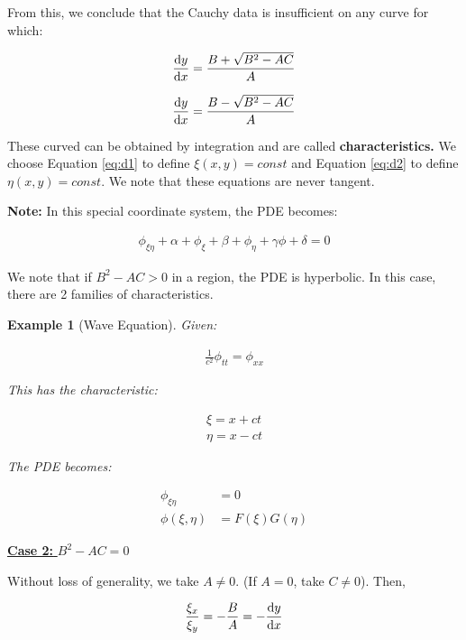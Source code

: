 \documentclass{article}
\newtheorem{ex}{Example}
\theoremstyle{definition}
\begin{document}
	From this, we conclude that the Cauchy data is insufficient on any curve for which:
	
	\begin{align}\label{eq:d1}
	\dv{y}{x} = \frac{B + \sqrt{B^2-AC}}{A}
	\end{align}
	
	\begin{align}\label{eq:d2}
	\dv{y}{x} = \frac{B - \sqrt{B^2-AC}}{A}
	\end{align}
	
	These curved can be obtained by integration and are called \textbf{characteristics.} We choose Equation \ref{eq:d1} to define $\xi(x,y) = const$ and Equation \ref{eq:d2} to define $\eta(x,y) = const$. We note that these equations are never tangent.
	
	\textbf{Note: } In this special coordinate system, the PDE becomes:
	
	\begin{align*}
	\phi_{\xi \eta} +\alpha + \phi_\xi + \beta + \phi_\eta + \gamma \phi + \delta = 0
	\end{align*}
	
	We note that if $B^2-AC>0$ in a region, the PDE is hyperbolic. In this case, there are 2 families of characteristics. 
	
	\begin{ex}[Wave Equation]
		Given:
		
		\begin{align*}
		\frac{1}{c^2}\phi_{tt}= \phi_{xx}
		\end{align*}
		
		This has the characteristic:
		
		\begin{align*}
		\xi = x + ct \\ 
		\eta = x - ct
		\end{align*}
		
		The PDE becomes:
		
		\begin{align*}
		\phi_{\xi \eta} &= 0 \\ 
		\phi(\xi, \eta)& = F(\xi) G(\eta)
		\end{align*}
	\end{ex}

\underline{\textbf{Case 2:} $B^2 - AC = 0$}

Without loss of generality, we take $A\neq 0$. (If $A=0$, take $C\neq 0$). Then, 

\begin{align*}
\frac{\xi_x}{\xi_y} = -\frac{B}{A} = - \dv{y}{x}
\end{align*}
\end{document}
